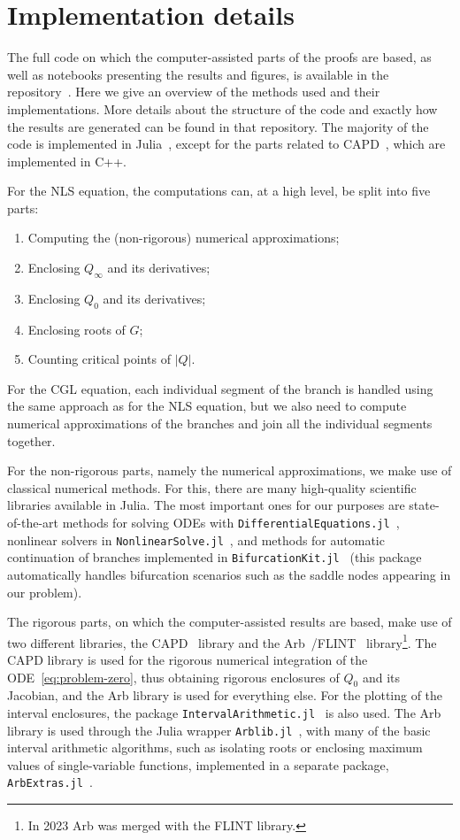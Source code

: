 \documentclass[11pt]{article}
\begin{document}
\section{Implementation details}
\label{sec:implementation-details}
The full code on which the computer-assisted parts of the proofs are
based, as well as notebooks presenting the results and figures, is
available in the repository~\cite{CGL.jl}. Here we give an overview of
the methods used and their implementations. More details about the
structure of the code and exactly how the results are generated can be
found in that repository. The majority of the code is implemented in
Julia~\cite{Julia-2017}, except for the parts related to
CAPD~\cite{Kapela2021}, which are implemented in C++.

For the NLS equation, the computations can, at a high level, be split
into five parts:
\begin{enumerate}
\item Computing the (non-rigorous) numerical approximations;
\item Enclosing \(Q_{\infty}\) and its derivatives;
\item Enclosing \(Q_{0}\) and its derivatives;
\item Enclosing roots of \(G\);
\item Counting critical points of \(|Q|\).
\end{enumerate}
For the CGL equation, each individual segment of the branch is handled
using the same approach as for the NLS equation, but we also need to
compute numerical approximations of the branches and join all the
individual segments together.

For the non-rigorous parts, namely the numerical approximations, we
make use of classical numerical methods. For this, there are many
high-quality scientific libraries available in Julia. The most
important ones for our purposes are state-of-the-art methods for
solving ODEs with
\texttt{DifferentialEquations.jl}~\cite{Rackauckas2017}, nonlinear
solvers in \texttt{NonlinearSolve.jl}~\cite{Pal2024}, and methods for
automatic continuation of branches implemented in
\texttt{BifurcationKit.jl}~\cite{BifurcationKit} (this package
automatically handles bifurcation scenarios such as the saddle nodes
appearing in our problem).

The rigorous parts, on which the computer-assisted results are based,
make use of two different libraries, the CAPD~\cite{Kapela2021}
library and the Arb~\cite{Johansson2017arb}/FLINT~\cite{Flint}
library\footnote{In 2023 Arb was merged with the FLINT library.}. The
CAPD library is used for the rigorous numerical integration of the
ODE~\eqref{eq:problem-zero}, thus obtaining rigorous enclosures of
\(Q_{0}\) and its Jacobian, and the Arb library is used for everything
else. For the plotting of the interval enclosures, the package
\texttt{IntervalArithmetic.jl}~\cite{IntervalArithmetic.jl} is also
used. The Arb library is used through the Julia wrapper
\texttt{Arblib.jl}~\cite{Arblib.jl}, with many of the basic interval
arithmetic algorithms, such as isolating roots or enclosing maximum
values of single-variable functions, implemented in a separate
package, \texttt{ArbExtras.jl}~\cite{ArbExtras.jl}.
\end{document}
